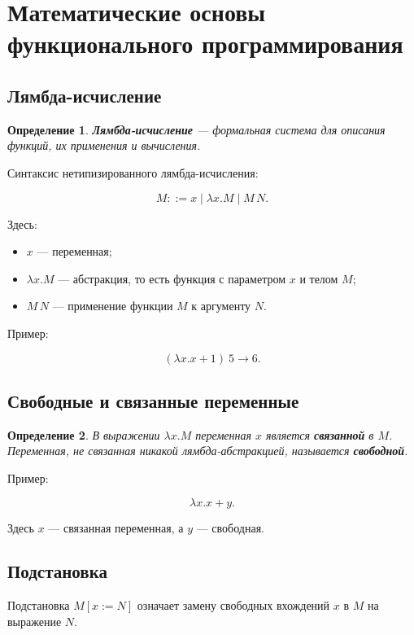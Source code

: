 \documentclass[12pt,a4paper]{article}
\newtheorem{definition}{Определение}
\begin{document}
\section{Математические основы функционального программирования}

\subsection{Лямбда-исчисление}

\begin{definition}
\textbf{Лямбда-исчисление} --- формальная система для описания функций, их применения и вычисления.
\end{definition}

Синтаксис нетипизированного лямбда-исчисления:

\[
M ::= x \mid \lambda x.M \mid M\,N.
\]

Здесь:
\begin{itemize}
  \item $x$ --- переменная;
  \item $\lambda x.M$ --- абстракция, то есть функция с параметром $x$ и телом $M$;
  \item $M\,N$ --- применение функции $M$ к аргументу $N$.
\end{itemize}

Пример:

\[
(\lambda x. x + 1)\ 5 \longrightarrow 6.
\]

\subsection{Свободные и связанные переменные}

\begin{definition}
В выражении $\lambda x.M$ переменная $x$ является \textbf{связанной} в $M$. Переменная, не связанная никакой лямбда-абстракцией, называется \textbf{свободной}.
\end{definition}

Пример:

\[
\lambda x. x + y.
\]

Здесь $x$ --- связанная переменная, а $y$ --- свободная.

\subsection{Подстановка}

Подстановка $M[x := N]$ означает замену свободных вхождений $x$ в $M$ на выражение $N$.
\end{document}
